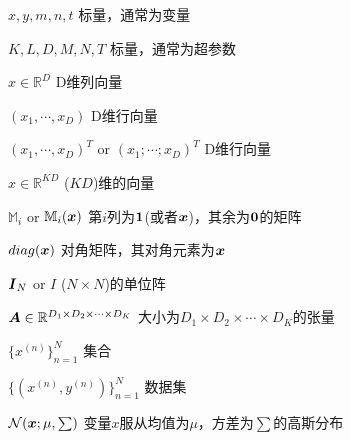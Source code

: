 \begin{denotation}

\item[$x,y,m,n,t$] 标量，通常为变量
\item[$K,L,D,M,N,T$] 标量，通常为超参数
\item[$x\in \mathbb{R}^{D}$] D维列向量
\item[$(x_1,\cdots,x_D)$] D维行向量
\item[$(x_1,\cdots,x_D)^T$ or $(x_1;\cdots;x_D)^T$]  D维行向量
\item[$x\in \mathbb{R}^{KD}$]  ($KD$)维的向量
\item[$\mathbb{M}_i$ or $\mathbb{M}_i(\boldsymbol{x})$]  第$i$列为$\boldsymbol{1}$(或者$\boldsymbol{x}$)，其余为$\boldsymbol{0}$的矩阵
\item[$diag(\boldsymbol{x})$]  对角矩阵，其对角元素为$\boldsymbol{x}$
\item[$\boldsymbol{I}_N$ or $I$]  ($N\times N$)的单位阵
\item[$\boldsymbol{A} \in \mathbb{R}^{D_1\times D_2\times \cdots \times D_K}$]  大小为$D_1\times D_2\times \cdots \times D_K$的张量
\item[$\{x^{(n)}\}^{N}_{n=1}$]  集合
\item[$\{(x^{(n)},y^{(n)})\}^{N}_{n=1}$]  数据集
\item[$\mathcal{N}(\boldsymbol{x};\mu,\sum)$]  变量$x$服从均值为$\mu$，方差为$\sum$的高斯分布

\end{denotation}

